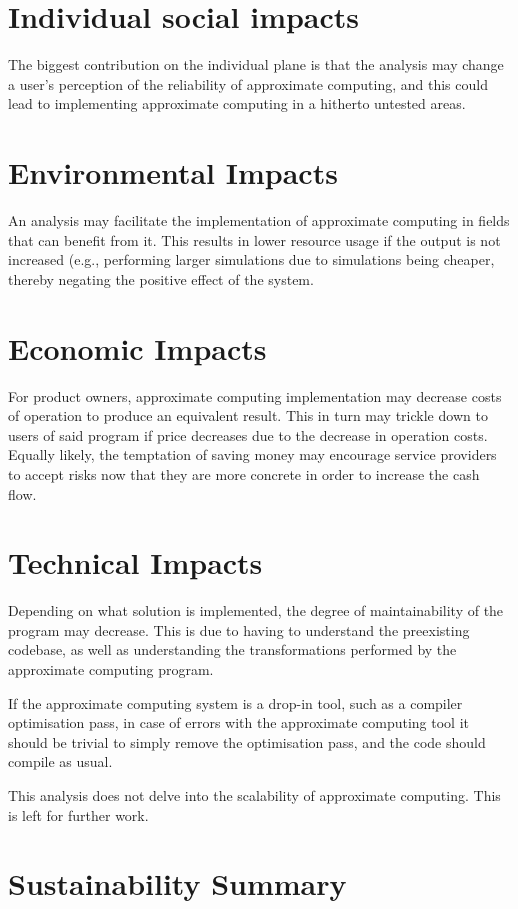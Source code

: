 \section{Individual social impacts}
The biggest contribution on the individual plane is that the analysis may change a user's perception of the reliability of approximate computing, and this could lead to implementing approximate computing in a hitherto untested areas. 


\section{Environmental Impacts}
An analysis may facilitate the implementation of approximate computing in fields that can benefit from it. This results in lower resource usage if the output is not increased (e.g., performing larger simulations due to simulations being cheaper, thereby negating the positive effect of the system.

\section{Economic Impacts}
For product owners, approximate computing implementation may decrease costs of operation to produce an equivalent result. This in turn may trickle down to users of said program if price decreases due to the decrease in operation costs. 
Equally likely, the temptation of saving money may encourage service providers to accept risks now that they are more concrete in order to increase the cash flow.

\section{Technical Impacts}
Depending on what solution is implemented, the degree of maintainability of the program may decrease. This is due to having to understand the preexisting codebase, as well as understanding the transformations performed by the approximate computing program. 

If the approximate computing system is a drop-in tool, such as a compiler optimisation pass, in case of errors with the approximate computing tool it should be trivial to simply remove the optimisation pass, and the code should compile as usual.

This analysis does not delve into the scalability of approximate computing. This is left for further work.


\section{Sustainability Summary}

